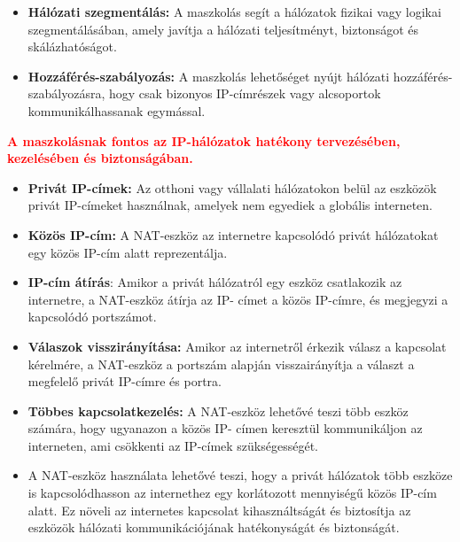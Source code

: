 \documentclass[12pt,a4paper]{article}
\begin{document}
\begin{tcolorbox}[colback=blue!5!white,colframe=blue!50!black,title= 43. Ismertesse az internetes címek maszkolási algoritmusát!]
\begin{itemize}
                    \item \textbf{Hálózati szegmentálás:} A maszkolás segít a hálózatok fizikai vagy logikai szegmentálásában, amely javítja a hálózati teljesítményt, biztonságot és skálázhatóságot.
                    \item \textbf{Hozzáférés-szabályozás:} A maszkolás lehetőséget nyújt hálózati hozzáférés-szabályozásra, hogy csak bizonyos IP-címrészek vagy alcsoportok kommunikálhassanak egymással.
                \end{itemize}
                \textcolor{red}{\textbf{A maszkolásnak fontos az IP-hálózatok hatékony tervezésében, kezelésében és biztonságában.}}
            \end{tcolorbox}
            
            \begin{tcolorbox}[colback=blue!5!white,colframe=blue!50!black,title= 44. Ismertesse a NAT (Network Address Translator) eszközt használatát az internethez való kapcsolódásban!]
                \begin{itemize}
                    \item \textbf{Privát IP-címek:} Az otthoni vagy vállalati hálózatokon belül az eszközök privát IP-címeket használnak, amelyek nem egyediek a globális interneten.
                    \item \textbf{Közös IP-cím:} A NAT-eszköz az internetre kapcsolódó privát hálózatokat egy közös IP-cím alatt reprezentálja.
                    \item \textbf{IP-cím átírás}: Amikor a privát hálózatról egy eszköz csatlakozik az internetre, a NAT-eszköz átírja az IP- címet a közös IP-címre, és megjegyzi a kapcsolódó portszámot.
                    \item \textbf{Válaszok visszirányítása:} Amikor az internetről érkezik válasz a kapcsolat kérelmére, a NAT-eszköz a portszám alapján visszairányítja a választ a megfelelő privát IP-címre és portra.
                    \item \textbf{Többes kapcsolatkezelés:} A NAT-eszköz lehetővé teszi több eszköz számára, hogy ugyanazon a közös IP- címen keresztül kommunikáljon az interneten, ami csökkenti az IP-címek szükségességét.
                    \item A NAT-eszköz használata lehetővé teszi, hogy a privát hálózatok több eszköze is kapcsolódhasson az internethez egy korlátozott mennyiségű közös IP-cím alatt. Ez növeli az internetes kapcsolat kihasználtságát és biztosítja az eszközök hálózati kommunikációjának hatékonyságát és biztonságát.
                \end{itemize}
            \end{tcolorbox}
\end{document}
